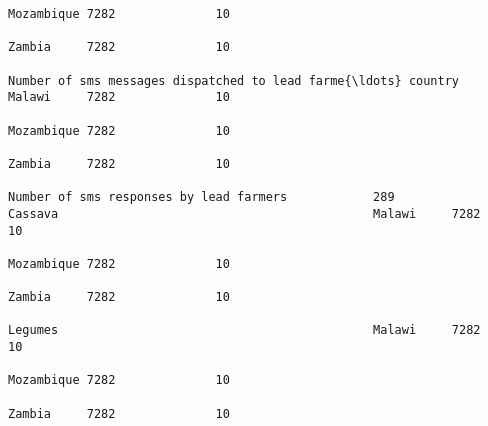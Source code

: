 \documentclass[11pt]{article}
\begin{document}
\begin{Verbatim}[commandchars=\\\{\}]
                                                                                                                                                                                                                 Mozambique 7282              10  
                                                                                                                                                                                                                 Zambia     7282              10  
                                                                         Number of sms messages dispatched to lead farme{\ldots} country                                                                              Malawi     7282              10  
                                                                                                                                                                                                                 Mozambique 7282              10  
                                                                                                                                                                                                                 Zambia     7282              10  
                                                                         Number of sms responses by lead farmers            289                               Cassava                                            Malawi     7282              10  
                                                                                                                                                                                                                 Mozambique 7282              10  
                                                                                                                                                                                                                 Zambia     7282              10  
                                                                                                                                                              Legumes                                            Malawi     7282              10  
                                                                                                                                                                                                                 Mozambique 7282              10  
                                                                                                                                                                                                                 Zambia     7282              10  

\end{Verbatim}
\end{document}
